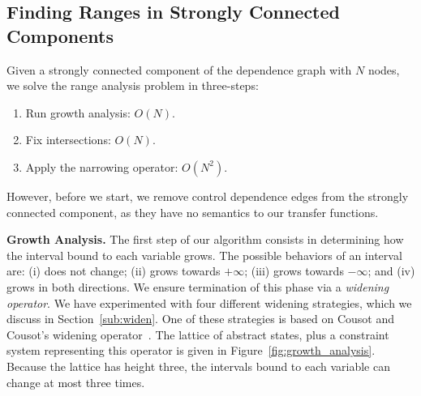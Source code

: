 \documentclass[preprint]{elsarticle}
\begin{document}
\subsection{Finding Ranges in Strongly Connected Components}
\label{sub:micro}

Given a strongly connected component of the dependence graph with $N$ nodes,
we solve the range analysis problem in three-steps:
\begin{enumerate}
\item Run growth analysis: $O(N)$.

\item Fix intersections: $O(N)$.

\item Apply the narrowing operator: $O(N^2)$.

\end{enumerate}
However, before we start, we remove control dependence edges from the
strongly connected component, as they have no semantics to our transfer
functions.

\noindent
\textbf{Growth Analysis.}
The first step of our algorithm consists in determining how the interval bound
to each variable grows.
The possible behaviors of an interval are:
(i) does not change;
(ii) grows towards $+\infty$;
(iii) grows towards $-\infty$; and
(iv) grows in both directions.
We ensure termination of this phase via a {\em widening operator}.
We have experimented with four different widening strategies, which we
discuss in Section~\ref{sub:widen}.
One of these strategies is based on Cousot and Cousot's widening
operator~\cite[p.247]{Cousot77}.
The lattice of abstract states, plus a constraint system representing this
operator is given in Figure~\ref{fig:growth_analysis}.
Because the lattice has height three, the intervals bound to each variable can
change at most three times.
\end{document}
